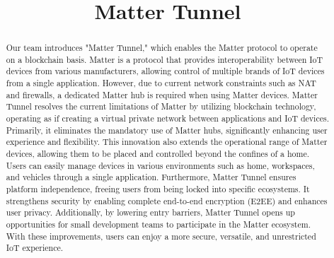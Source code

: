\documentclass[conference]{IEEEtran}
\begin{document}
\title{Matter Tunnel}

\author{
	\and
	\and
	\and
}
\maketitle

\begin{abstract}
	Our team introduces "Matter Tunnel," which enables the Matter protocol to operate on a blockchain basis. Matter is a protocol that provides interoperability between IoT devices from various manufacturers, allowing control of multiple brands of IoT devices from a single application. However, due to current network constraints such as NAT and firewalls, a dedicated Matter hub is required when using Matter devices.
	Matter Tunnel resolves the current limitations of Matter by utilizing blockchain technology, operating as if creating a virtual private network between applications and IoT devices. Primarily, it eliminates the mandatory use of Matter hubs, significantly enhancing user experience and flexibility. This innovation also extends the operational range of Matter devices, allowing them to be placed and controlled beyond the confines of a home. Users can easily manage devices in various environments such as home, workspaces, and vehicles through a single application.
	Furthermore, Matter Tunnel ensures platform independence, freeing users from being locked into specific ecosystems. It strengthens security by enabling complete end-to-end encryption (E2EE) and enhances user privacy. Additionally, by lowering entry barriers, Matter Tunnel opens up opportunities for small development teams to participate in the Matter ecosystem. With these improvements, users can enjoy a more secure, versatile, and unrestricted IoT experience.
\end{abstract}
\end{document}
